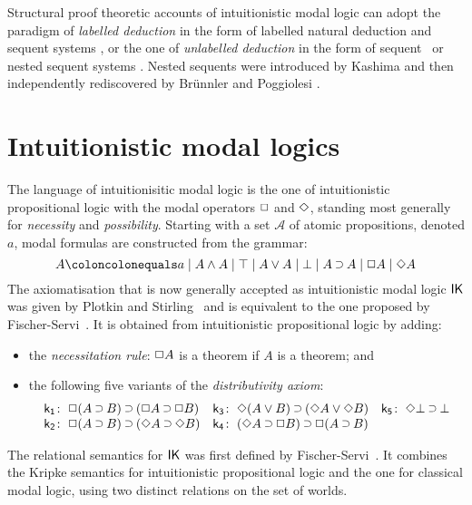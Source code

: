 \documentclass[twoside]{aiml20}
\begin{document}
Structural proof theoretic accounts of intuitionistic modal logic can adopt the paradigm of \emph{labelled deduction} in the form of labelled natural deduction and sequent systems \cite{simpson1994proof},
or the one of \emph{unlabelled deduction} in the form of sequent~\cite{bierman2000} or nested sequent systems \cite{strassburger2013cut}.
Nested sequents were introduced by Kashima \cite{kashima1994cut} and then independently rediscovered by Br\"{u}nnler \cite{brunnler2009deep} and Poggiolesi \cite{poggiolesi2009method}.

\section{Intuitionistic modal logics}
The language of {intuitionisitic modal logic} is the one of intuitionistic propositional logic with the modal operators $\mathord{\Box}$ and $\mathord{\Diamond}$, standing most generally for \emph{necessity} and \emph{possibility}.
%
Starting with a set $\mathcal{A}$ of atomic propositions, denoted $a$, modal formulas are constructed from the grammar:
%
$$
A \coloncolonequals
a \mid A \AND A \mid \TOP \mid A \OR A \mid \BOT \mid A \IMP A \mid \BOX A \mid \DIA A
$$
%
The axiomatisation that is now generally accepted as intuitionistic modal logic $\mathsf{IK}$ was given by Plotkin and Stirling~\cite{plotkin1986} and is equivalent to the one proposed by Fischer-Servi~\cite{fischer1984}.
%
It is obtained from intuitionistic propositional logic by adding:
\begin{itemize}
	\item the \emph{necessitation rule}: $\mathord{\Box} A$ is a theorem if $A$ is a theorem; and
	\item the following five variants of the \emph{distributivity axiom}:
	\begin{equation*}
	\label{eq:ik}%
	\begin{array}[t]{r@{\;}l@{\quad}r@{\;}l@{\quad}r@{\;}l}
	\kax[1]\colon&\BOX(A\IMP B)\IMP(\BOX A\IMP\BOX B)
	&
	\kax[3]\colon&\DIA(A\OR B)\IMP(\DIA A\OR\DIA B)
	&
	\kax[5]\colon&\DIA\BOT\IMP\BOT
	\\
	\kax[2]\colon&\BOX(A\IMP B)\IMP(\DIA A\IMP\DIA B)
	&
	\kax[4]\colon&(\DIA A\IMP \BOX B)\IMP\BOX(A\IMP B)\\%
	\end{array}
	\end{equation*}
\end{itemize}

The relational semantics for $\mathsf{IK}$ was first defined by Fischer-Servi~\cite{fischer1984}.
%
It combines the Kripke semantics for intuitionistic propositional logic and the one for classical modal logic, using two distinct relations on the set of worlds.
\end{document}
